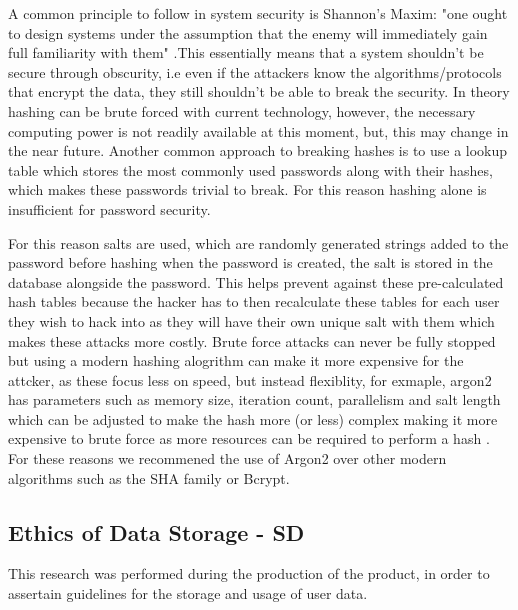 \documentclass[10pt, notitlepage]{report}
\begin{document}
A common principle to follow in system security is Shannon's Maxim: "one ought to design systems under the assumption that the enemy will immediately gain full familiarity with them" \cite{Shannon1949}.This essentially means that a system shouldn’t be secure through obscurity, i.e even if the attackers know the algorithms/protocols that encrypt the data, they still shouldn’t be able to break the security. In theory hashing can be brute forced with current technology, however, the necessary computing power is not readily available at this moment, but, this may change in the near future. Another common approach to breaking hashes is to use a lookup table which stores the most commonly used passwords along with their hashes, which makes these passwords trivial to break. For this reason hashing alone is insufficient for password security. \cite{Tsudik1992}

For this reason salts are used, which are randomly generated strings added to the password before hashing when the password is created, the salt is stored in the database alongside the password. This helps prevent against these pre-calculated hash tables because the hacker has to then recalculate these tables for each user they wish to hack into as they will have their own unique salt with them which makes these attacks more costly. Brute force attacks can never be fully stopped but using a modern hashing alogrithm can make it more expensive for the attcker, as these focus less on speed, but instead flexiblity, for exmaple, argon2 has parameters such as memory size, iteration count, parallelism and salt length which can be adjusted to make the hash more (or less) complex making it more expensive to brute force as more resources can be required to perform a hash \cite{Biryukov2016}. For these reasons we recommened the use of Argon2 over other modern algorithms such as the SHA family or Bcrypt.

\subsection{Ethics of Data Storage - SD}
\label{res:datastor}

This research was performed during the production of the product, in order to assertain guidelines for the storage and usage of user data.\newline
\end{document}
